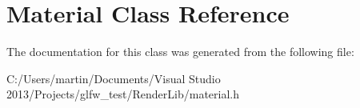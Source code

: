 \hypertarget{class_material}{}\section{Material Class Reference}
\label{class_material}


The documentation for this class was generated from the following file\+:\begin{DoxyCompactItemize}
\item 
C\+:/\+Users/martin/\+Documents/\+Visual Studio 2013/\+Projects/glfw\+\_\+test/\+Render\+Lib/material.\+h\end{DoxyCompactItemize}
